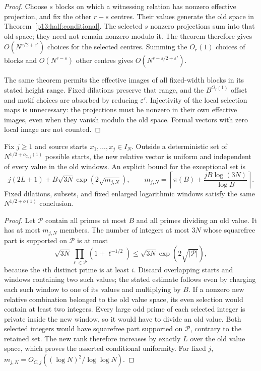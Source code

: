 \begin{proof}
Choose $s$ blocks on which a witnessing relation has nonzero effective
projection, and fix the other $r-s$ centres. Their values generate the
old space in Theorem~\ref{p13:half:conditional}. The selected $s$
nonzero projections sum into that old space; they need not remain
nonzero modulo it. The theorem therefore gives
$O(N^{s/2+\varepsilon'})$ choices for the selected centres.
Summing the $O_r(1)$ choices of blocks and $O(N^{r-s})$ other centres
gives $O(N^{r-s/2+\varepsilon'})$.

The same theorem permits the effective images of all fixed-width blocks
in its stated height range. Fixed dilations preserve that range, and
the $B^{O_r(1)}$ offset and motif choices are absorbed by reducing
$\varepsilon'$. Injectivity of the local selection maps is unnecessary:
the projections must be nonzero in their own effective images, even when
they vanish modulo the old space. Formal vectors with zero local image
are not counted.
\end{proof}

\begin{proposition}
\label{p1:arith:fixed-branching}
Fix $j\geq1$ and source starts $x_1,\ldots,x_j\in I_N$.
Outside a deterministic set of $N^{1/2+o_{C,j}(1)}$ possible starts,
the new relative vector is uniform and independent of every value in
the old windows.  An explicit bound for the exceptional set is
\[
 j(2L+1)+B\sqrt{3N}\exp(2\sqrt{m_{j,N}}),\qquad
 m_{j,N}=\left\lceil\pi(B)+\frac{jB\log(3N)}{\log B}\right\rceil.
\]
Fixed dilations, subsets, and fixed enlarged logarithmic windows satisfy
the same $N^{1/2+o(1)}$ conclusion.
\end{proposition}

\begin{proof}
Let $\mathcal P$ contain all primes at most $B$ and all primes dividing
an old value.  It has at most $m_{j,N}$ members.
The number of integers at most $3N$ whose squarefree part is supported
on $\mathcal P$ is at most
\[
 \sqrt{3N}\prod_{\ell\in\mathcal P}(1+\ell^{-1/2})
 \leq\sqrt{3N}\exp(2\sqrt{|\mathcal P|}),
\]
because the $i$th distinct prime is at least $i$.
Discard overlapping starts and windows containing two such values;
the stated estimate follows even by charging each such window to one
of its values and multiplying by $B$.
If a nonzero new relative combination belonged to the old value space,
its even selection would contain at least two integers.  Every large
odd prime of each selected integer is private inside the new window,
so it would have to divide an old value.  Both selected integers would
have squarefree part supported on $\mathcal P$, contrary to the retained
set.  The new rank therefore increases by exactly $L$ over the old
value space, which proves the asserted conditional uniformity.
For fixed $j$, $m_{j,N}=O_{C,j}((\log N)^2/\log\log N)$.
\end{proof}


